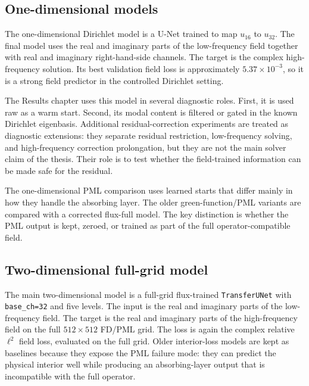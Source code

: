\subsection{One-dimensional models}
\label{subsec:setup-1d-models}

The one-dimensional Dirichlet model is a U-Net trained to map $u_{16}$ to
$u_{32}$. The final model uses the real and imaginary parts of the
low-frequency field together with real and imaginary right-hand-side channels.
The target is the complex high-frequency solution. Its best validation field
loss is approximately $5.37\times10^{-3}$, so it is a strong field predictor
in the controlled Dirichlet setting.

The Results chapter uses this model in several diagnostic roles. First, it is
used raw as a warm start. Second, its modal content is filtered or gated in
the known Dirichlet eigenbasis. Additional residual-correction experiments are
treated as diagnostic extensions: they separate residual restriction,
low-frequency solving, and high-frequency correction prolongation, but they
are not the main solver claim of the thesis. Their role is to test whether the
field-trained information can be made safe for the residual.

The one-dimensional PML comparison uses learned starts that differ mainly in
how they handle the absorbing layer. The older green-function/PML variants are
compared with a corrected flux-full model. The key distinction is whether the
PML output is kept, zeroed, or trained as part of the full
operator-compatible field.

\subsection{Two-dimensional full-grid model}
\label{subsec:setup-2d-model}

The main two-dimensional model is a full-grid flux-trained
\texttt{TransferUNet} with \texttt{base\_ch=32} and five levels. The input is
the real and imaginary parts of the low-frequency field. The target is the
real and imaginary parts of the high-frequency field on the full
$512\times512$ FD/PML grid. The loss is again the complex relative $\ell^2$
field loss, evaluated on the full grid. Older interior-loss models are kept as
baselines because they expose the PML failure mode: they can predict the
physical interior well while producing an absorbing-layer output that is
incompatible with the full operator.


